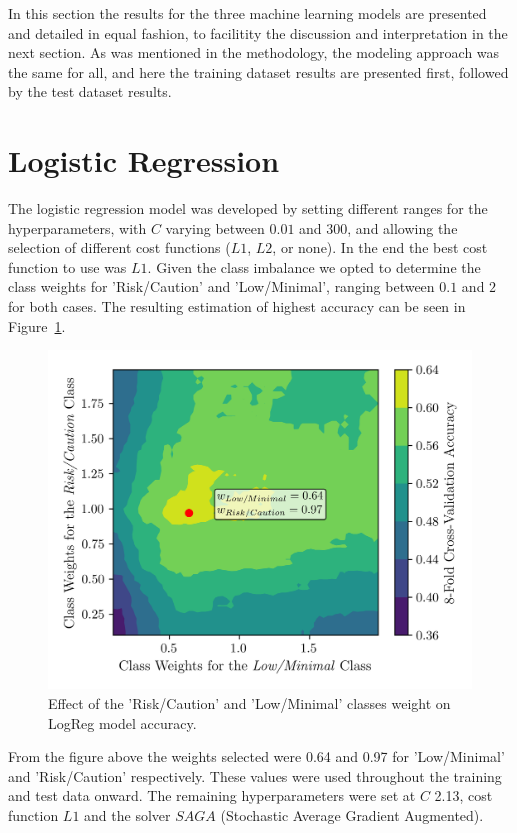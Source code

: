 \documentclass[conference]{IEEEtran}
\begin{document}
In this section the results for the three machine learning models are presented and detailed in equal fashion, to facilitity the discussion and interpretation in the next section. As was mentioned in the methodology, the modeling approach was the same for all, and here the training dataset results are presented first, followed by the test dataset results.

\section{Logistic Regression}

The logistic regression model was developed by setting different ranges for the hyperparameters, with $C$ varying between $0.01$ and $300$, and allowing the selection of different cost functions ($L1$, $L2$, or none). In the end the best cost function to use was $L1$. Given the class imbalance we opted to determine the class weights for 'Risk/Caution' and 'Low/Minimal', ranging between $0.1$ and $2$ for both cases. The resulting estimation of highest accuracy can be seen in Figure~\ref{logregWt}.

\begin{figure}[H]
    \centering
    \includegraphics[width=1\linewidth]{assets/LOGR_class_weights.png}
    \caption{Effect of the 'Risk/Caution' and 'Low/Minimal' classes weight on LogReg model accuracy.}
    \label{logregWt}
\end{figure}

From the figure above the weights selected were 0.64 and 0.97 for 'Low/Minimal' and 'Risk/Caution' respectively. These values were used throughout the training and test data onward. The remaining hyperparameters were set at $C$ 2.13, cost function $L1$ and the solver $SAGA$ (Stochastic Average Gradient Augmented).
\end{document}
